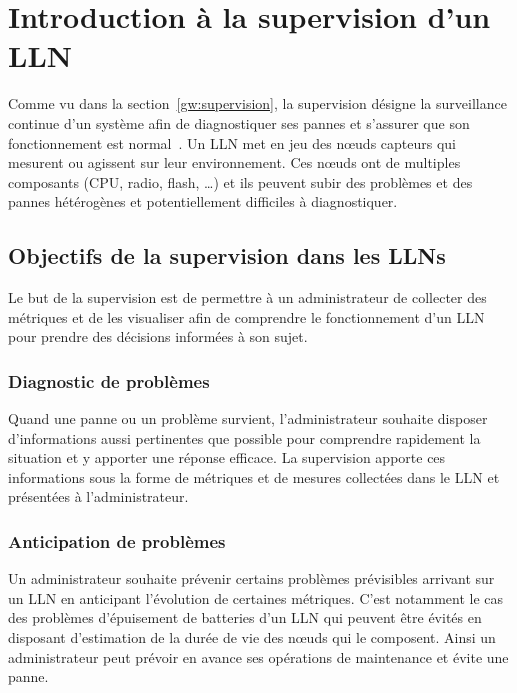\section{Introduction à la supervision d'un \ac{LLN}}
\label{supervision:intro}

Comme vu dans la section~\ref{gw:supervision}, la supervision désigne la surveillance continue d'un système afin de diagnostiquer ses pannes et s'assurer que son fonctionnement est normal~\cite{ligus2012effective}.
Un \ac{LLN} met en jeu des nœuds capteurs qui mesurent ou agissent sur leur environnement.
Ces nœuds ont de multiples composants (\ac{CPU}, radio, flash, \ldots) et ils peuvent subir des problèmes et des pannes hétérogènes et potentiellement difficiles à diagnostiquer.

\subsection{Objectifs de la supervision dans les \ac{LLN}s}

Le but de la supervision est de permettre à un administrateur de collecter des métriques et de les visualiser afin de comprendre le fonctionnement d'un \ac{LLN} pour prendre des décisions informées à son sujet.

\subsubsection{Diagnostic de problèmes}

Quand une panne ou un problème survient, l'administrateur souhaite disposer d'informations aussi pertinentes que possible pour comprendre rapidement la situation et y apporter une réponse efficace.
La supervision apporte ces informations sous la forme de métriques et de mesures collectées dans le \ac{LLN} et présentées à l'administrateur.

\subsubsection{Anticipation de problèmes}

Un administrateur souhaite prévenir certains problèmes prévisibles arrivant sur un \ac{LLN} en anticipant l'évolution de certaines métriques.
C'est notamment le cas des problèmes d'épuisement de batteries d'un \ac{LLN} qui peuvent être évités en disposant d'estimation de la durée de vie des nœuds qui le composent.
Ainsi un administrateur peut prévoir en avance ses opérations de maintenance et évite une panne.

